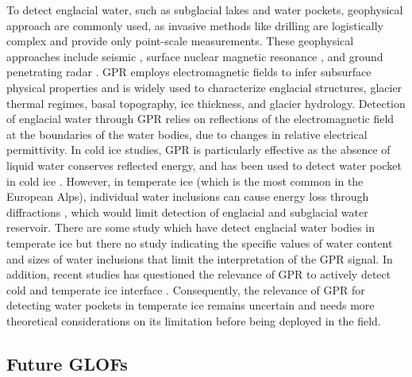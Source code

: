 To detect englacial water, such as subglacial lakes and water pockets, geophysical approach are commonly used, as invasive methods like drilling are logistically complex and provide only point-scale measurements. These geophysical approaches include seismic \citep[e.g.][]{Guillemot&al2024}, surface nuclear magnetic resonance \citep[SNMR, e.g.][]{Legchenko&2014}, and ground penetrating radar \citep[GPR, see][for a review on glaciological applications]{Woodward&Burke2007,Plewes&Hubbard2001,Navarro&Eisen2009,Schroeder&al2020}. GPR employs electromagnetic fields to infer subsurface physical properties and is widely used to characterize englacial structures, glacier thermal regimes, basal topography, ice thickness, and glacier hydrology. Detection of englacial water through GPR relies on reflections of the electromagnetic field at the boundaries of the water bodies, due to changes in relative electrical permittivity. In cold ice studies, GPR is particularly effective as the absence of liquid water conserves reflected energy, and has been used to detect water pocket in cold ice \citep{Vincent&al2012}. However, in temperate ice (which is the most common in the European Alps), individual water inclusions can cause energy loss through diffractions \citep{Smith&Evans1972,Murray&al2000}, which would limit detection of englacial and subglacial water reservoir. There are some study which have detect englacial water bodies in temperate ice \citep[e.g.][]{Egli&al2021b,Church&al2021,Ruols&al2023} but there no study indicating the specific values of water content and sizes of water inclusions that limit the interpretation of the GPR signal. In addition, recent studies has questioned the relevance of GPR to actively detect cold and temperate ice interface \citep[e.g.][]{Brown&al2009}. Consequently, the relevance of GPR for detecting water pockets in temperate ice remains uncertain and needs more theoretical considerations on its limitation before being deployed in the field.


\subsection{Future GLOFs}

